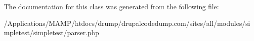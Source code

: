 The documentation for this class was generated from the following file:\begin{DoxyCompactItemize}
\item 
/Applications/MAMP/htdocs/drump/drupalcodedump.com/sites/all/modules/simpletest/simpletest/parser.php\end{DoxyCompactItemize}
